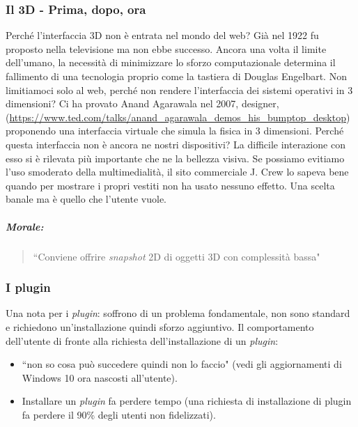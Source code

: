 			\subsubsection{Il 3D - Prima, dopo, ora}
				Perché l'interfaccia 3D non è entrata nel mondo del web? Già nel 1922 fu proposto nella televisione ma non ebbe successo. Ancora una volta il limite dell'umano, la necessità di minimizzare lo sforzo computazionale determina il fallimento di una tecnologia proprio come la tastiera di Douglas Engelbart. 
				Non limitiamoci solo al web, perché non rendere l'interfaccia dei sistemi operativi in 3 dimensioni? Ci ha provato Anand Agarawala nel 2007, designer, (\url{https://www.ted.com/talks/anand_agarawala_demos_his_bumptop_desktop}) proponendo una interfaccia virtuale che simula la fisica in 3 dimensioni. Perché questa interfaccia non è ancora ne nostri dispositivi? La difficile interazione con esso si è rilevata più importante che ne la bellezza visiva.
				Se possiamo evitiamo l'uso smoderato della multimedialità, il sito commerciale J. Crew lo sapeva bene quando per mostrare i propri vestiti non ha usato nessuno effetto. Una scelta banale ma è quello che l'utente vuole.
				
				\subparagraph*{Morale:}
				\begin{quote}
					``Conviene offrire \emph{snapshot} 2D di oggetti 3D con complessità bassa"
				\end{quote}
				
			\subsubsection{I plugin}
				Una nota per i \emph{plugin}: soffrono di un problema fondamentale, non sono standard e richiedono un'installazione quindi sforzo aggiuntivo. Il comportamento dell'utente di fronte alla richiesta dell'installazione di un \emph{plugin}:
				\begin{itemize}
					\item ``non so cosa può succedere quindi non lo faccio" (vedi gli aggiornamenti di Windows 10 ora nascosti all'utente).
					\item Installare un \emph{plugin} fa perdere tempo (una richiesta di installazione di plugin fa perdere il 90\% degli utenti non fidelizzati).
				\end{itemize}
			
